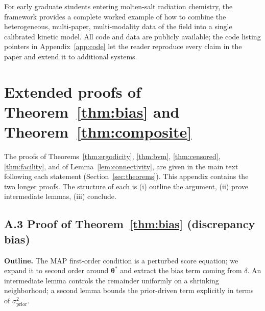 \documentclass[12pt]{article}
\theoremstyle{plain}
\theoremstyle{definition}
\theoremstyle{remark}
\begin{document}
For early graduate students entering molten-salt radiation chemistry, the
framework provides a complete worked example of how to combine the
heterogeneous, multi-paper, multi-modality data of the field into a single
calibrated kinetic model.  All code and data are publicly available; the code
listing pointers in Appendix~\ref{app:code} let the reader reproduce every
claim in the paper and extend it to additional systems.

\appendix
\section{Extended proofs of Theorem~\ref{thm:bias} and Theorem~\ref{thm:composite}}\label{app:proofs}

The proofs of Theorems~\ref{thm:ergodicity}, \ref{thm:bvm},
\ref{thm:censored}, \ref{thm:facility}, and of
Lemma~\ref{lem:connectivity}, are given in the main text following each
statement (Section~\ref{sec:theorems}).  This appendix contains the two
longer proofs.  The structure of each is (i) outline the argument,
(ii) prove intermediate lemmas, (iii) conclude.

\subsection*{A.3 Proof of Theorem~\ref{thm:bias} (discrepancy bias)}

\textbf{Outline.}  The MAP first-order condition is a perturbed score
equation; we expand it to second order around $\boldsymbol\theta^*$ and
extract the bias term coming from $\delta$.  An intermediate lemma
controls the remainder uniformly on a shrinking neighborhood; a second
lemma bounds the prior-driven term explicitly in terms of
$\sigma_{\mathrm{prior}}^2$.
\end{document}
